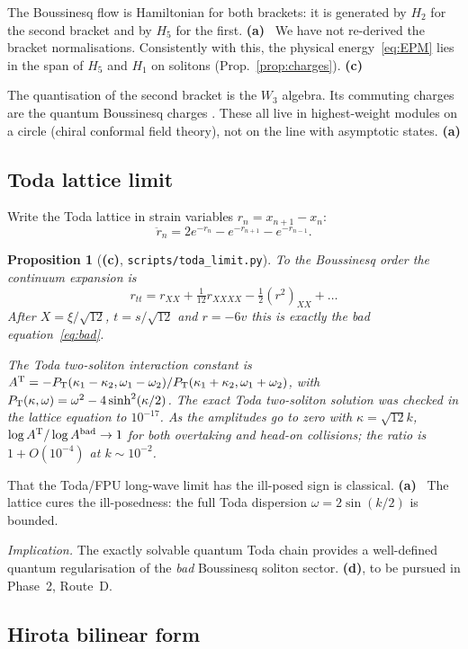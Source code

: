 \documentclass[11pt,a4paper]{article}
\newcommand{\La}{\textsf{\textbf{(a)}}}
\newcommand{\Lc}{\textsf{\textbf{(c)}}}
\newcommand{\Ld}{\textsf{\textbf{(d)}}}
\newcommand{\script}[1]{\texttt{scripts/#1}}
\newtheorem{proposition}{Proposition}[section]
\theoremstyle{remark}
\begin{document}
The Boussinesq flow is Hamiltonian for both brackets: it is generated by $H_2$ for the second bracket and by $H_5$ for the first. \La~\cite{Dickey,MathieuOevel} We have not re-derived the bracket normalisations. Consistently with this, the physical energy~\eqref{eq:EPM} lies in the span of $H_5$ and $H_1$ on solitons (Prop.~\ref{prop:charges}). \Lc

The quantisation of the second bracket is the $W_3$ algebra. Its commuting charges are the quantum Boussinesq charges \cite{KM,Bordner,BHK,MR,Ashok1,Ashok2}. These all live in highest-weight modules on a circle (chiral conformal field theory), not on the line with asymptotic states. \La

\subsection{Toda lattice limit}\label{sec:toda}

Write the Toda lattice in strain variables $r_n=x_{n+1}-x_n$:
\[
\ddot r_n=2e^{-r_n}-e^{-r_{n+1}}-e^{-r_{n-1}} .
\]
\begin{proposition}[\Lc, \script{toda\_limit.py}]
To the Boussinesq order the continuum expansion is
\[
r_{tt}=r_{XX}+\tfrac1{12}r_{XXXX}-\tfrac12(r^2)_{XX}+\dots
\]
After $X=\xi/\sqrt{12}$, $t=s/\sqrt{12}$ and $r=-6v$ this is exactly the \emph{bad} equation~\eqref{eq:bad}.

The Toda two-soliton interaction constant is $A^{\rm T}=-P_{\rm T}(\kappa_1-\kappa_2,\omega_1-\omega_2)/P_{\rm T}(\kappa_1+\kappa_2,\omega_1+\omega_2)$, with $P_{\rm T}(\kappa,\omega)=\omega^2-4\sinh^2(\kappa/2)$. The exact Toda two-soliton solution was checked in the lattice equation to $10^{-17}$. As the amplitudes go to zero with $\kappa=\sqrt{12}k$, $\log A^{\rm T}/\log A^{\rm bad}\to1$ for both overtaking and head-on collisions; the ratio is $1+O(10^{-4})$ at $k\sim10^{-2}$.
\end{proposition}

That the Toda/FPU long-wave limit has the ill-posed sign is classical. \La~\cite{Zak,BC} The lattice cures the ill-posedness: the full Toda dispersion $\omega=2\sin(k/2)$ is bounded.

\emph{Implication.} The exactly solvable quantum Toda chain \cite{Sutherland,Gutzwiller,Sklyanin,Mertens,SiddharthanShastry,PustilnikMatveev} provides a well-defined quantum regularisation of the \emph{bad} Boussinesq soliton sector. \Ld, to be pursued in Phase~2, Route~D.

\subsection{Hirota bilinear form}
\end{document}
